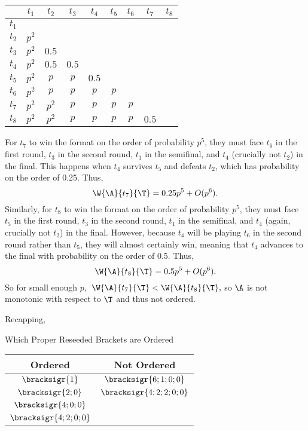 {{        \begin{center}
            \begin{tabular}{c | c c c c c c c c}
            & $t_1$ & $t_2$ & $t_3$ & $t_4$ & $t_5$ & $t_6$ & $t_7$ & $t_8$\\ 
            \hline
            $t_1$ &  &  &  &  & & & & \\
            $t_2$ & $p^2$ &  &  &  &  & & & \\
            $t_3$ & $p^2$ &  $0.5$ &  &  &  &  & & \\
            $t_4$ & $p^2$ & $0.5$ & $0.5$ &  &  &  &  & \\
            $t_5$ & $p^2$ & $p$ & $p$ & $0.5$ &  &  &  & \\
            $t_6$ & $p^2$ & $p$ & $p$ & $p$ & $p$ &  &  & \\
            $t_7$ & $p^2$ & $p^2$ & $p$ & $p$ & $p$ & $p$ &  & \\
            $t_8$ & $p^2$ & $p^2$ & $p$ & $p$ & $p$ & $p$ & $0.5$ & \\
            \end{tabular}
        \end{center}


        For $t_7$ to win the format on the order of probability $p^5$, they must face $t_6$ in the first round, $t_3$ in the second round, $t_1$ in the semifinal, and $t_4$ (crucially not $t_2$) in the final. This happens when $t_4$ survives $t_5$ and defeats $t_2$, which has probability on the order of 0.25. Thus, 
            $$\W{\A}{t_7}{\T} = 0.25p^5 + O(p^6).$$
        Similarly, for $t_8$ to win the format on the order of probability $p^5$, they must face $t_5$ in the first round, $t_3$ in the second round, $t_1$ in the semifinal, and $t_4$ (again, crucially not $t_2$) in the final. However, because $t_4$ will be playing $t_6$ in the second round rather than $t_5$, they will almost certainly win, meaning that $t_4$ advances to the final with probability on the order of 0.5. Thus, 
$$\W{\A}{t_8}{\T} = 0.5p^5 + O(p^6).$$
         So for small enough $p,$ $\W{\A}{t_7}{\T} < \W{\A}{t_8}{\T},$ so $\A$ is not monotonic with respect to $\T$ and thus not ordered.
    }{}{\fried}

    \pagebreak

    Recapping,

    \begin{figg}{Which Proper Reseeded Brackets are Ordered}{}
        \begin{center}
            \begin{tabular}{ c | c }
                Ordered & Not Ordered\\
                \hline
                $\bracksigr{1}$ & $\bracksigr{6;1;0;0}$\\
                $\bracksigr{2;0}$ & $\bracksigr{4;2;2;0;0}$\\
                $\bracksigr{4;0;0}$ & \\
                $\bracksigr{4;2;0;0}$ & \\
            \end{tabular}
        \end{center}
    \end{figg} 

}
